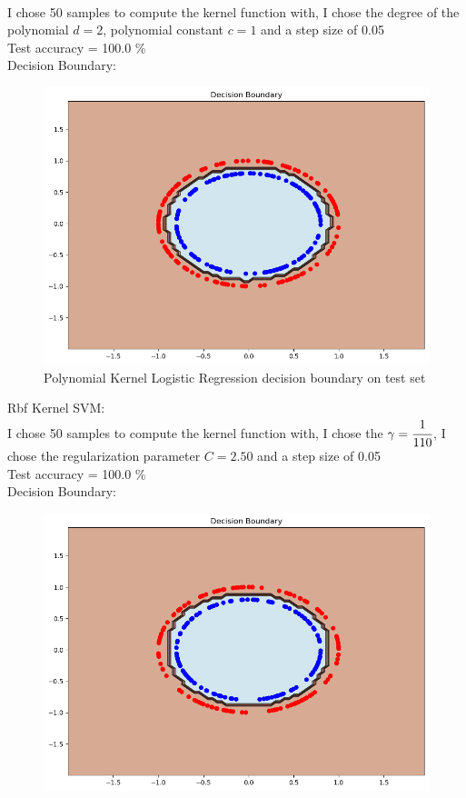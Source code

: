\documentclass[a4paper]{article}
\theoremstyle{definition}
\newenvironment{soln}{
    \leavevmode\color{blue}\ignorespaces
}{}
\begin{document}
\begin{enumerate}
\begin{soln}
    \\ I chose 50 samples to compute the kernel function with, I chose the degree of the polynomial $d = 2$, polynomial constant $c = 1$ and a step size of 0.05
    \\ Test accuracy = 100.0 \%
    \\ Decision Boundary:
    \begin{figure}[H]
        \includegraphics[width=\textwidth]{images/circles-poly-lr.png}
        \caption{ Polynomial Kernel Logistic Regression decision boundary on test set}
    \end{figure}
    {\fontsize{10pt}{12pt}\selectfont Rbf Kernel SVM:} 
    \\ I chose 50 samples to compute the kernel function with, I chose the $\gamma = \cfrac{1}{110}$, I chose the regularization parameter $C = 2.50$ and a step size of 0.05
    \\ Test accuracy = 100.0 \%
    \\ Decision Boundary:
    \begin{figure}[H]
        \includegraphics[width=\textwidth]{images/circles-rbf-svm.png}

\end{figure}
\end{soln}
\end{enumerate}
\end{document}
